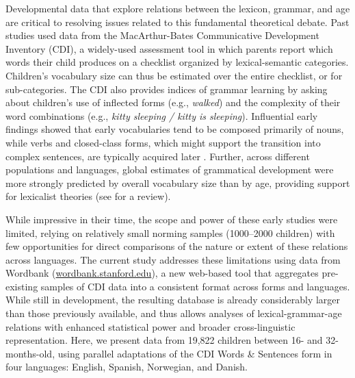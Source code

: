 \documentclass[10pt,letterpaper]{article}
\begin{document}
Developmental data that explore relations between the lexicon, grammar, and age are critical to resolving issues related to this fundamental theoretical debate. Past studies used data from the MacArthur-Bates Communicative Development Inventory (CDI), a widely-used assessment tool in which parents report which words their child produces on a checklist organized by lexical-semantic categories. Children's vocabulary size can thus be estimated over the entire checklist, or for sub-categories. The CDI also provides indices of grammar learning by asking about children's use of inflected forms (e.g., \emph{walked}) and the complexity of their word combinations (e.g., \emph{kitty sleeping / kitty is sleeping}). Influential early findings showed that early vocabularies tend to be composed primarily of nouns, while verbs and closed-class forms, which might support the transition into complex sentences, are typically acquired later \cite{bates1994}. Further, across different populations and languages, global estimates of grammatical development were more strongly predicted by overall vocabulary size than by age, providing support for lexicalist theories (see  for a review).


While impressive in their time, the scope and power of these early studies were limited, relying on relatively small norming samples (1000--2000 children) with few opportunities for direct comparisons of the nature or extent of these relations across languages. The current study addresses these limitations using data from Wordbank (\url{wordbank.stanford.edu}), a new web-based tool that aggregates pre-existing samples of CDI data into a consistent format across forms and languages. While still in development, the resulting database is already considerably larger than those previously available, and thus allows analyses of lexical-grammar-age relations with enhanced statistical power and broader cross-linguistic representation. Here, we present data from 19,822 children between 16- and 32-months-old, using parallel adaptations of the CDI Words \& Sentences form in four languages: English, Spanish, Norwegian, and Danish.

\end{document}
